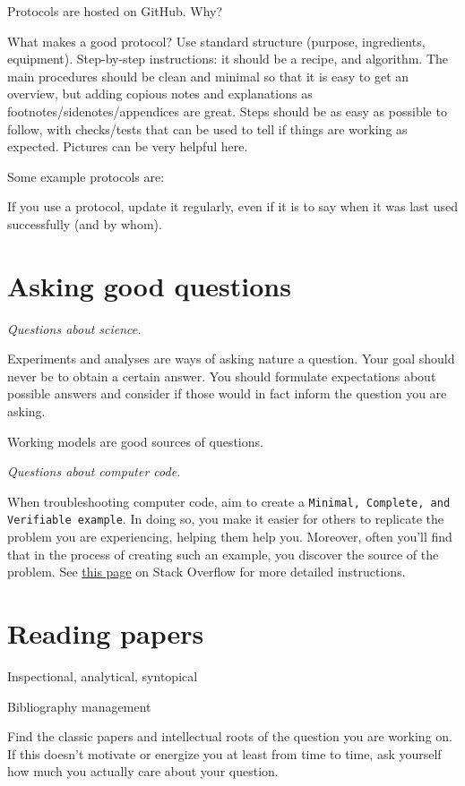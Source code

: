 \documentclass{tufte-book}
\newcommand{\doccls}[1]{\texttt{#1}}%
\begin{document}
Protocols are hosted on GitHub. Why?

What makes a good protocol? Use standard structure (purpose,
ingredients, equipment). Step-by-step instructions: it should be a
recipe, and algorithm. The main procedures should be clean and minimal
so that it is easy to get an overview, but adding copious notes and
explanations as footnotes/sidenotes/appendices are great. Steps should
be as easy as possible to follow, with checks/tests that can be used
to tell if things are working as expected. Pictures can be very
helpful here.

Some example protocols are:

If you use a protocol, update it regularly, even if it is to say when
it was last used successfully (and by whom).


\section{Asking good questions}

{\it Questions about science.}

Experiments and analyses are ways of asking nature a question. Your
goal should never be to obtain a certain answer. You should formulate
expectations about possible answers and consider if those would in
fact inform the question you are asking.

Working models are good sources of questions.

{\it Questions about computer code.} 

When troubleshooting computer code, aim to create a \doccls{Minimal,
  Complete, and Verifiable example}. In doing so, you make it easier
for others to replicate the problem you are experiencing, helping them
help you. Moreover, often you'll find that in the process of creating
such an example, you discover the source of the problem. See
\href{https://stackoverflow.com/help/mcve}{this page} on Stack
Overflow for more detailed
instructions.


\section{Reading papers}

Inspectional, analytical, syntopical

Bibliography management

Find the classic papers and intellectual roots of the question you are
working on. If this doesn't motivate or energize you at least from
time to time, ask yourself how much you actually care about your question.
\end{document}
